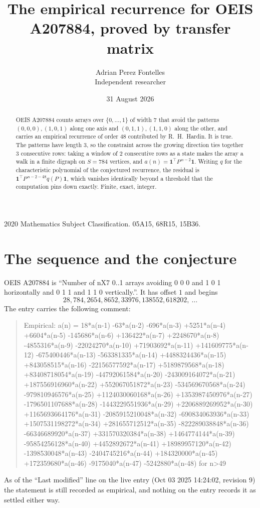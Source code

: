 \documentclass[11pt,a4paper]{article}
\title{The empirical recurrence for OEIS A207884, proved by transfer matrix}
\author{Adrian Perez Fontelles\\ \small Independent researcher}
\date{31 August 2026}
\theoremstyle{plain}
\theoremstyle{definition}
\begin{document}
\maketitle

\begin{abstract}
OEIS A207884 counts arrays over $\{0,\dots,1\}$ of width $7$ that avoid the patterns
$(0,0,0), (1,0,1)$ along one axis and $(0,1,1), (1,1,0)$ along the other, and carries an empirical recurrence of
order $48$ contributed by R.~H.~Hardin. It is true. The patterns have length $3$, so
the constraint across the growing direction ties together $3$ consecutive rows: taking a
window of $2$ consecutive rows as a state makes the array a walk in a finite digraph
on $S=784$ vertices, and $a(n)=\mathbf{1}^{\!\top}P^{\,n-2}\mathbf{1}$. Writing $q$
for the characteristic polynomial of the conjectured recurrence, the residual is
$\mathbf{1}^{\!\top}P^{\,n-2-48}q(P)\mathbf{1}$, which vanishes identically
beyond a threshold that the computation pins down exactly. Finite, exact, integer.
\end{abstract}

\noindent\small 2020 Mathematics Subject Classification. 05A15, 68R15, 15B36.\normalsize

\section{The sequence and the conjecture}

OEIS A207884 is ``Number of nX7 0..1 arrays avoiding 0 0 0 and 1 0 1 horizontally and 0 1 1 and 1 1 0 vertically.''. It has offset
$1$ and begins
\[
28, 784, 2654, 8652, 33976, 138552, 618202,\ \dots
\]
The entry carries the following comment:
\begin{quote}\small
Empirical: a(n) = 18*a(n-1) -63*a(n-2) -696*a(n-3) +5251*a(n-4) +6604*a(n-5) -145686*a(n-6) +136422*a(n-7) +2248670*a(n-8) -4855316*a(n-9) -22024270*a(n-10) +71903692*a(n-11) +141609775*a(n-12) -675400446*a(n-13) -563381335*a(n-14) +4488324436*a(n-15) +843058515*a(n-16) -22156577592*a(n-17) +5189879568*a(n-18) +83408718054*a(n-19) -44792061584*a(n-20) -243009164072*a(n-21) +187556916960*a(n-22) +552067051872*a(n-23) -534569670568*a(n-24) -979810946576*a(n-25) +1124030060168*a(n-26) +1353987450976*a(n-27) -1796501107688*a(n-28) -1443229551936*a(n-29) +2206889269952*a(n-30) +1165693664176*a(n-31) -2085915210048*a(n-32) -690834063936*a(n-33) +1507531198272*a(n-34) +281655712512*a(n-35) -822289038848*a(n-36) -66346689920*a(n-37) +331570320384*a(n-38) +1464774144*a(n-39) -95854256128*a(n-40) +4452892672*a(n-41) +18989957120*a(n-42) -1398530048*a(n-43) -2404745216*a(n-44) +184320000*a(n-45) +172359680*a(n-46) -9175040*a(n-47) -5242880*a(n-48) for n>49
\end{quote}
As of the ``Last modified'' line on the live entry (Oct 03 2025 14:24:02, revision
9) the statement is still recorded as empirical, and nothing on the entry
records it as settled either way.
\end{document}
